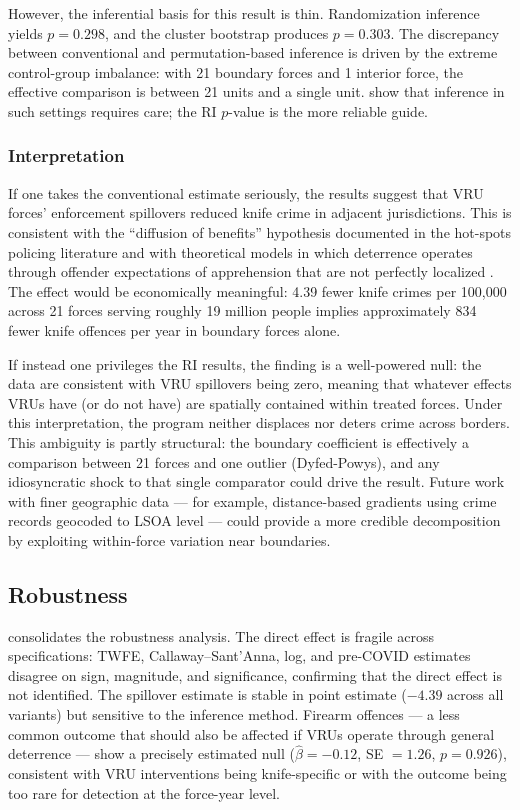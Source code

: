 \documentclass[12pt]{article}
\begin{document}
However, the inferential basis for this result is thin. Randomization inference yields $p = 0.298$, and the cluster bootstrap produces $p = 0.303$. The discrepancy between conventional and permutation-based inference is driven by the extreme control-group imbalance: with 21 boundary forces and 1 interior force, the effective comparison is between 21 units and a single unit. \citet{conleytaber2011} show that inference in such settings requires care; the RI $p$-value is the more reliable guide.

\subsubsection*{Interpretation} If one takes the conventional estimate seriously, the results suggest that VRU forces' enforcement spillovers reduced knife crime in adjacent jurisdictions. This is consistent with the ``diffusion of benefits'' hypothesis documented in the hot-spots policing literature \citep{weisburd2006displacement, braga2019hotspots} and with theoretical models in which deterrence operates through offender expectations of apprehension that are not perfectly localized \citep{chalfin2022criminology}. The effect would be economically meaningful: 4.39 fewer knife crimes per 100,000 across 21 forces serving roughly 19 million people implies approximately 834 fewer knife offences per year in boundary forces alone.

If instead one privileges the RI results, the finding is a well-powered null: the data are consistent with VRU spillovers being zero, meaning that whatever effects VRUs have (or do not have) are spatially contained within treated forces. Under this interpretation, the program neither displaces nor deters crime across borders. This ambiguity is partly structural: the boundary coefficient is effectively a comparison between 21 forces and one outlier (Dyfed-Powys), and any idiosyncratic shock to that single comparator could drive the result. Future work with finer geographic data --- for example, distance-based gradients using crime records geocoded to LSOA level --- could provide a more credible decomposition by exploiting within-force variation near boundaries.

\subsection{Robustness}

 consolidates the robustness analysis. The direct effect is fragile across specifications: TWFE, Callaway--Sant'Anna, log, and pre-COVID estimates disagree on sign, magnitude, and significance, confirming that the direct effect is not identified. The spillover estimate is stable in point estimate ($-4.39$ across all variants) but sensitive to the inference method. Firearm offences --- a less common outcome that should also be affected if VRUs operate through general deterrence --- show a precisely estimated null ($\hat\beta = -0.12$, SE $= 1.26$, $p = 0.926$), consistent with VRU interventions being knife-specific or with the outcome being too rare for detection at the force-year level.
\end{document}
